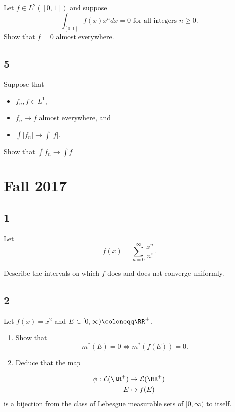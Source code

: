 Let \(f\in L^2([0, 1])\) and suppose \[
\int_{[0,1]} f(x) x^{n} d x=0 \text { for all integers } n \geq 0.
\] Show that \(f = 0\) almost everywhere.

\hypertarget{section-4}{%
\subsection{5}\label{section-4}}

Suppose that

\begin{itemize}
\tightlist
\item
  \(f_n, f \in L^1\),
\item
  \(f_n \to f\) almost everywhere, and
\item
  \(\int\left|f_{n}\right| \rightarrow \int|f|\).
\end{itemize}

Show that \(\int f_{n} \rightarrow \int f\)

\hypertarget{fall-2017}{%
\section{Fall 2017}\label{fall-2017}}

\hypertarget{section}{%
\subsection{1}\label{section}}

Let \[
f(x) = \sum_{n=0}^{\infty} \frac{x^{n}}{n !}.
\]

Describe the intervals on which \(f\) does and does not converge
uniformly.

\hypertarget{section-1}{%
\subsection{2}\label{section-1}}

Let \(f(x) = x^2\) and \(E \subset [0, \infty) \coloneqq \RR^+\).

\begin{enumerate}
\def\labelenumi{\arabic{enumi}.}
\item
  Show that \[
  m^*(E) = 0 \iff m^*(f(E)) = 0.
  \]
\item
  Deduce that the map
\end{enumerate}

\begin{align*}
\phi: \mathcal{L}(\RR^+) &\to \mathcal{L}(\RR^+) \\
E &\mapsto f(E)
\end{align*} is a bijection from the class of Lebesgue measurable sets
of \([0, \infty)\) to itself.

